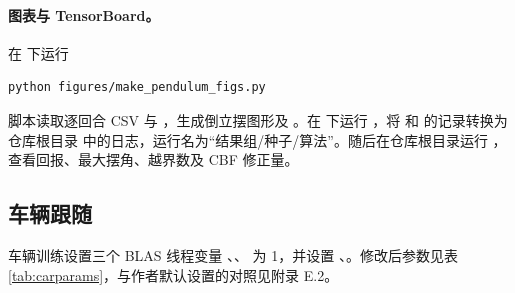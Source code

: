 \documentclass[UTF8,a4paper,zihao=-4,fontset=fandol]{ctexart}
\begin{document}
\paragraph{图表与 TensorBoard。}
在  下运行
\begin{lstlisting}[language={},numbers=none,frame=none,breakatwhitespace=true,aboveskip=5pt,belowskip=7pt]
python figures/make_pendulum_figs.py
\end{lstlisting}
脚本读取逐回合 CSV 与 ，生成倒立摆图形及 。在  下运行 ，将  和  的记录转换为仓库根目录  中的日志，运行名为“结果组/种子/算法”。随后在仓库根目录运行 ，查看回报、最大摆角、越界数及 CBF 修正量。

\subsection{车辆跟随}
\label{app:repro-car}
车辆训练设置三个 BLAS 线程变量 、、 为 1，并设置 、。修改后参数见表 \ref{tab:carparams}，与作者默认设置的对照见附录 E.2。
\end{document}
